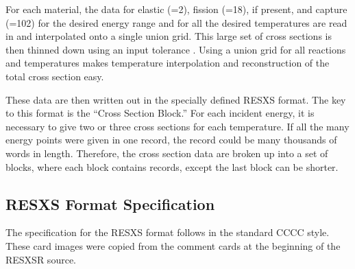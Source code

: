 For each material, the data for elastic (=2), fission (=18),
if present, and capture (=102) for the desired energy range and
for all the desired temperatures are read in and interpolated
onto a single union grid.  This large set of cross sections is then
thinned down using an input tolerance .  Using a union
grid for all reactions and temperatures makes temperature interpolation
and reconstruction of the total cross section easy.

These data are then written out in the specially defined RESXS
format.  The key to this format is the ``Cross Section Block.''  For each
incident energy, it is necessary to give  two or three cross sections
for each temperature.  If all the many energy points were given in one
record, the record could be many thousands of words in length.  Therefore, the
cross section data are broken up into a set of blocks, where each block
contains  records, except the last block can be shorter.


\subsection{RESXS Format Specification}
\label{ssRESXSR_format}

The specification for the RESXS format follows in the standard
CCCC style\cite{CCCC4}.  These card images were copied from the
comment cards at the beginning of the RESXSR source.

